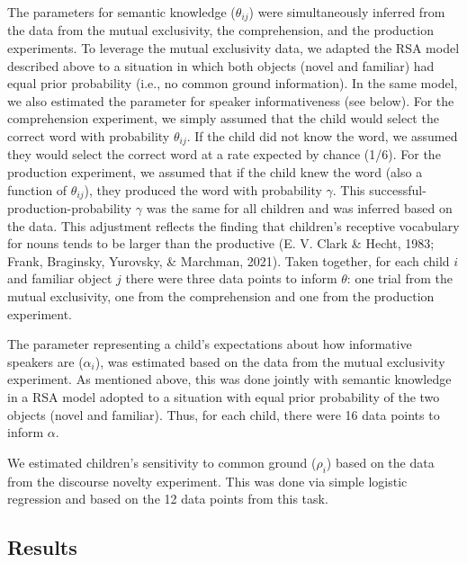 \documentclass[
  man,floatsintext]{apa6}
\begin{document}
The parameters for semantic knowledge (\(\theta_{ij}\)) were simultaneously inferred from the data from the mutual exclusivity, the comprehension, and the production experiments. To leverage the mutual exclusivity data, we adapted the RSA model described above to a situation in which both objects (novel and familiar) had equal prior probability (i.e., no common ground information). In the same model, we also estimated the parameter for speaker informativeness (see below). For the comprehension experiment, we simply assumed that the child would select the correct word with probability \(\theta_{ij}\). If the child did not know the word, we assumed they would select the correct word at a rate expected by chance (1/6). For the production experiment, we assumed that if the child knew the word (also a function of \(\theta_{ij}\)), they produced the word with probability \(\gamma\). This successful-production-probability \(\gamma\) was the same for all children and was inferred based on the data. This adjustment reflects the finding that children's receptive vocabulary for nouns tends to be larger than the productive (E. V. Clark \& Hecht, 1983; Frank, Braginsky, Yurovsky, \& Marchman, 2021). Taken together, for each child \(i\) and familiar object \(j\) there were three data points to inform \(\theta\): one trial from the mutual exclusivity, one from the comprehension and one from the production experiment.

The parameter representing a child's expectations about how informative speakers are (\(\alpha_i\)), was estimated based on the data from the mutual exclusivity experiment. As mentioned above, this was done jointly with semantic knowledge in a RSA model adopted to a situation with equal prior probability of the two objects (novel and familiar). Thus, for each child, there were 16 data points to inform \(\alpha\).

We estimated children's sensitivity to common ground (\(\rho_i\)) based on the data from the discourse novelty experiment. This was done via simple logistic regression and based on the 12 data points from this task.

\hypertarget{results}{%
\subsection{Results}\label{results}}
\end{document}
